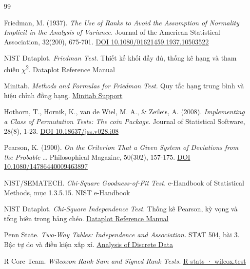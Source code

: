 \documentclass[11pt,a4paper]{article}
\begin{document}
\begin{thebibliography}{99}

  Friedman, M. (1937). \emph{The Use of Ranks to Avoid the Assumption of Normality Implicit in the Analysis of Variance.} Journal of the American Statistical Association, 32(200), 675-701.
  \href{https://doi.org/10.1080/01621459.1937.10503522}{DOI 10.1080/01621459.1937.10503522}

  NIST Dataplot. \emph{Friedman Test.} Thiết kế khối đầy đủ, thống kê hạng và tham chiếu \ensuremath{\chi}\textsuperscript{2}.
  \href{https://www.itl.nist.gov/div898/software/dataplot/refman1/auxillar/friedman.htm}{Dataplot Reference Manual}

  Minitab. \emph{Methods and Formulas for Friedman Test.} Quy tắc hạng trung bình và hiệu chỉnh đồng hạng.
  \href{https://support.minitab.com/en-us/minitab/help-and-how-to/statistics/nonparametrics/how-to/friedman-test/methods-and-formulas/methods-and-formulas/}{Minitab Support}

  Hothorn, T., Hornik, K., van de Wiel, M. A., \& Zeileis, A. (2008). \emph{Implementing a Class of Permutation Tests: The coin Package.} Journal of Statistical Software, 28(8), 1-23.
  \href{https://doi.org/10.18637/jss.v028.i08}{DOI 10.18637/jss.v028.i08}

  Pearson, K. (1900). \emph{On the Criterion That a Given System of Deviations from the Probable \ldots{}} Philosophical Magazine, 50(302), 157-175.
  \href{https://doi.org/10.1080/14786440009463897}{DOI 10.1080/14786440009463897}

  NIST/SEMATECH. \emph{Chi-Square Goodness-of-Fit Test.} e-Handbook of Statistical Methods, mục 1.3.5.15.
  \href{https://www.itl.nist.gov/div898/handbook/eda/section3/eda35f.htm}{NIST e-Handbook}

  NIST Dataplot. \emph{Chi-Square Independence Test.} Thống kê Pearson, kỳ vọng và tổng biên trong bảng chéo.
  \href{https://www.itl.nist.gov/div898/software/dataplot/refman1/auxillar/chistest.htm}{Dataplot Reference Manual}

  Penn State. \emph{Two-Way Tables: Independence and Association.} STAT 504, bài 3. Bậc tự do và điều kiện xấp xỉ.
  \href{https://online.stat.psu.edu/stat504/Lesson03}{Analysis of Discrete Data}

  R Core Team. \emph{Wilcoxon Rank Sum and Signed Rank Tests.}
  \href{https://stat.ethz.ch/R-manual/R-devel/library/stats/html/wilcox.test.html}{R stats · wilcox.test}


\end{thebibliography}
\end{document}
